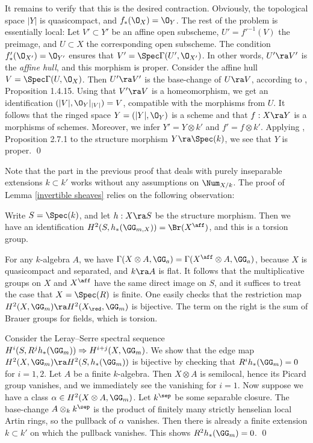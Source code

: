It remains to verify that this is the desired contraction. Obviously, the topological space $|Y|$ is quasicompact, and $f_*(\O_X)=\O_Y$.
The rest of the  problem is essentially local: Let $V'\subset Y'$ be an affine open subscheme,  $U'=f'^{-1}(V)$ the preimage,
and $U\subset X$ the corresponding open subscheme.
The condition $f'_*(\O_{X'})=\O_{Y'}$ ensures that
$V'=\Spec\Gamma(U',\O_{X'})$. In other words, $U'\ra V'$ is the \emph{affine hull}, and this morphism is proper.
Consider the affine hull $V=\Spec\Gamma(U,\O_X)$. Then $U'\ra V'$ is the base-change of $U\ra V$, according to \cite{EGA-IIIa}, Proposition 1.4.15.
Using that $V'\ra V$ is a homeomorphism, we get an identification $(|V|,\O_Y|_{|V|})=V$, compatible with the morphisms from $U$.
It follows that the ringed space $Y=(|Y|,\O_Y)$
is a scheme and that $f:X\ra Y$ is a morphisms of schemes.  Moreover, we infer $Y'=Y\otimes k'$ and $f'=f\otimes k'$.
Applying \cite{EGA-IVb}, Proposition 2.7.1 to the structure morphism $Y\ra \Spec(k)$, we see that $Y$ is proper.
\qed


Note that the    part in the  previous proof that  deals with purely inseparable extensions $k\subset k'$
works without any assumptions on $\Num_{X/k}$.
The  proof of Lemma \ref{invertible sheaves} relies on  the following observation:

\begin{lemma}
\notready
\label{brauer group}
Write $S=\Spec(k)$, and let $h:X\ra S$ be the structure morphism. Then we have an identification $H^2(S,h_*(\GG_{m,X}))=\Br(X^\aff)$,
and this is a torsion group.
\end{lemma}

\proof
For any $k$-algebra $A$, we have $\Gamma(X\otimes A,\GG_a)=\Gamma(X^\aff\otimes A,\GG_a)$,
because $X$ is   quasicompact and separated, and $k\ra A$ is flat.  It follows that the multiplicative groups
on $X$ and $X^\aff$ have the same direct image on $S$, and it suffices to treat the case that $X=\Spec(R)$ is finite.
One easily checks that the restriction map $H^2(X,\GG_m)\ra H^2(X_\red,\GG_m)$ is bijective.
The term on the right is the sum of Brauer groups for  fields, which is torsion.

Consider the Leray--Serre spectral sequence $H^i(S,R^jh_*(\GG_{m}))\Rightarrow H^{i+j}(X,\GG_m)$.
We show that the edge map $H^2(X,\GG_m)\ra H^2(S,h_*(\GG_{m}))$ is bijective by checking that
  $R^ih_*(\GG_{m})=0$ for $i=1,2$.
Let $A$ be a finite $k$-algebra. Then $X\otimes A$ is semilocal, hence its Picard group vanishes, and we immediately see the
vanishing for $i=1$. Now suppose we have a  class $\alpha\in H^2(X\otimes A,\GG_m)$.
Let $k^\sep$ be some separable closure. The base-change $A\otimes_kk^\sep$ is the product of finitely many
strictly henselian local Artin rings, so the pullback of $\alpha$ vanishes. Then there is already
a finite extension $k\subset k'$ on which the pullback vanishes. This shows $R^2h_*(\GG_m)=0$.
\qed


